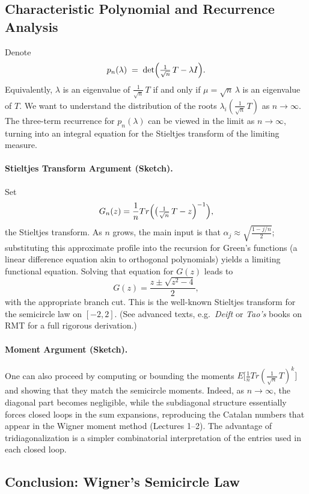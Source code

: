 \documentclass[letterpaper,11pt,oneside,reqno]{article}
\numberwithin{equation}{section}
\theoremstyle{definition}
\begin{document}
\subsection{Characteristic Polynomial and Recurrence Analysis}

Denote
\[
  p_n(\lambda) \;=\;
  \det\Bigl(\tfrac1{\sqrt{n}}\,T - \lambda I\Bigr).
\]
Equivalently, $\lambda$ is an eigenvalue of $\frac{1}{\sqrt{n}}\,T$ if and only if $\mu = \sqrt{n}\,\lambda$ is an eigenvalue of $T$. We want to understand the distribution of the roots $\lambda_i(\frac{1}{\sqrt{n}}\,T)$ as $n\to\infty$. The three-term recurrence for $p_n(\lambda)$ can be viewed in the limit as $n\to\infty$, turning into an integral equation for the Stieltjes transform of the limiting measure.

\paragraph{Stieltjes Transform Argument (Sketch).}
Set
\[
  G_n(z)
  = \frac{1}{n}Tr\Bigl(\bigl(\tfrac{1}{\sqrt{n}}\,T - z\Bigr)^{-1}\Bigr),
\]
the Stieltjes transform. As $n$ grows, the main input is that $\alpha_j\approx \sqrt{\frac{1-j/n}{2}}$; substituting this approximate profile into the recursion for Green’s functions (a linear difference equation akin to orthogonal polynomials) yields a limiting functional equation. Solving that equation for $G(z)$ leads to
\[
  G(z) = \frac{z \pm \sqrt{z^2-4}}{2},
\]
with the appropriate branch cut. This is the well-known Stieltjes transform for the semicircle law on $[-2,2]$. (See advanced texts, e.g.\ \emph{Deift} or \emph{Tao’s} books on RMT for a full rigorous derivation.)

\paragraph{Moment Argument (Sketch).}
One can also proceed by computing or bounding the moments $ E\bigl[\frac{1}{n}Tr(\frac{1}{\sqrt{n}}\,T)^k\bigr]$ and showing that they match the semicircle moments. Indeed, as $n\to\infty$, the diagonal part becomes negligible, while the subdiagonal structure essentially forces closed loops in the sum expansions, reproducing the Catalan numbers that appear in the Wigner moment method (Lectures 1--2). The advantage of tridiagonalization is a simpler combinatorial interpretation of the entries used in each closed loop.

\subsection{Conclusion: Wigner’s Semicircle Law}
\end{document}
